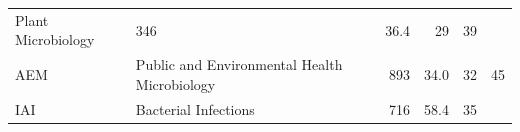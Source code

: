 \documentclass[11pt,]{article}
\begin{document}
\begin{longtable}[]{@{}llrrrr@{}}
\begin{minipage}[t]{0.43\columnwidth}
Plant Microbiology\strut
\end{minipage} & \begin{minipage}[t]{0.04\columnwidth}\raggedleft\strut
346\strut
\end{minipage} & \begin{minipage}[t]{0.08\columnwidth}\raggedleft\strut
36.4\strut
\end{minipage} & \begin{minipage}[t]{0.11\columnwidth}\raggedleft\strut
29\strut
\end{minipage} & \begin{minipage}[t]{0.11\columnwidth}\raggedleft\strut
39\strut
\end{minipage}\tabularnewline
\begin{minipage}[t]{0.06\columnwidth}\raggedright\strut
AEM\strut
\end{minipage} & \begin{minipage}[t]{0.43\columnwidth}\raggedright\strut
Public and Environmental Health Microbiology\strut
\end{minipage} & \begin{minipage}[t]{0.04\columnwidth}\raggedleft\strut
893\strut
\end{minipage} & \begin{minipage}[t]{0.08\columnwidth}\raggedleft\strut
34.0\strut
\end{minipage} & \begin{minipage}[t]{0.11\columnwidth}\raggedleft\strut
32\strut
\end{minipage} & \begin{minipage}[t]{0.11\columnwidth}\raggedleft\strut
45\strut
\end{minipage}\tabularnewline
\begin{minipage}[t]{0.06\columnwidth}\raggedright\strut
IAI\strut
\end{minipage} & \begin{minipage}[t]{0.43\columnwidth}\raggedright\strut
Bacterial Infections\strut
\end{minipage} & \begin{minipage}[t]{0.04\columnwidth}\raggedleft\strut
716\strut
\end{minipage} & \begin{minipage}[t]{0.08\columnwidth}\raggedleft\strut
58.4\strut
\end{minipage} & \begin{minipage}[t]{0.11\columnwidth}\raggedleft\strut
35\strut
\end{minipage} & \begin{minipage}[t]{0.11\columnwidth}\raggedleft\strut

\end{minipage}
\end{longtable}
\end{document}
